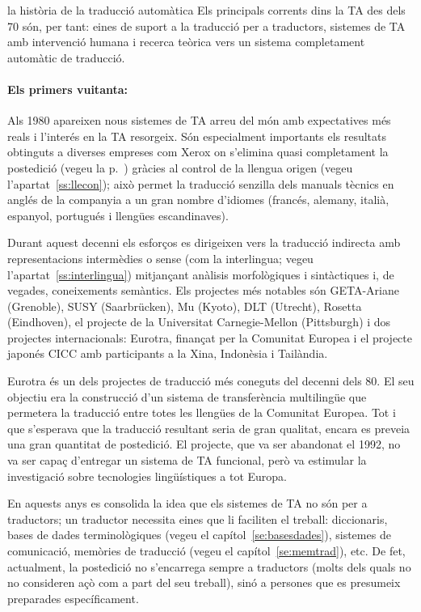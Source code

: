 \begin{persabermes}{la història de la traducció automàtica}
  Els principals corrents dins la TA des dels 70 són, per tant: eines
  de suport a la traducció per a traductors, sistemes de TA amb
  intervenció humana i recerca teòrica vers un sistema completament
  automàtic de traducció.

  \paragraph{Els primers vuitanta:} Als 1980 apareixen nous sistemes
  de TA arreu del món amb expectatives més reals i l'interés en la TA
  resorgeix.  Són especialment importants els resultats obtinguts a
  diverses empreses com Xerox on s'elimina quasi completament la
  postedició (vegeu la p.~\pageref{pg:homografia}) gràcies al control
  de la llengua origen (vegeu l'apartat~\ref{ss:llecon}); això permet
  la traducció senzilla dels manuals tècnics en anglés de la companyia
  a un gran nombre d'idiomes (francés, alemany, italià, espanyol,
  portugués i llengües escandinaves).

  Durant aquest decenni els esforços es dirigeixen vers la traducció
  indirecta amb representacions intermèdies o sense (com la
  interlingua; vegeu l'apartat~\ref{ss:interlingua}) mitjançant
  anàlisis morfològiques i sintàctiques i, de vegades, coneixements
  semàntics.  Els projectes més notables són GETA-Ariane (Grenoble),
  SUSY (Saarbrücken), Mu (Kyoto), DLT (Utrecht), Rosetta (Eindhoven),
  el projecte de la Universitat Carnegie-Mellon (Pittsburgh) i dos
  projectes internacionals: Eurotra, finançat per la Comunitat Europea
  i el projecte japonés CICC amb participants a la Xina, Indonèsia i
  Tailàndia.

  Eurotra és un dels projectes de traducció més coneguts del decenni
  dels 80. El seu objectiu era la construcció d'un sistema de
  transferència multilingüe que permetera la traducció entre totes les
  llengües de la Comunitat Europea.  Tot i que s'esperava que la
  traducció resultant seria de gran qualitat, encara es preveia una
  gran quantitat de postedició. El projecte, que va ser abandonat el
  1992, no va ser capaç d'entregar un sistema de TA funcional, però va
  estimular la investigació sobre tecnologies lingüístiques a tot
  Europa.

  En aquests anys es consolida la idea que els sistemes de TA no són
  per a traductors; un traductor necessita eines que li faciliten el
  treball: diccionaris, bases de dades terminològiques (vegeu el
  capítol~\ref{se:basesdades}), sistemes de comunicació, memòries de
  traducció (vegeu el capítol~\ref{se:memtrad}), etc.  De fet,
  actualment, la postedició no s'encarrega sempre a traductors (molts
  dels quals no no consideren açò com a part del seu treball), sinó a
  persones que es presumeix preparades específicament.


\end{persabermes}
